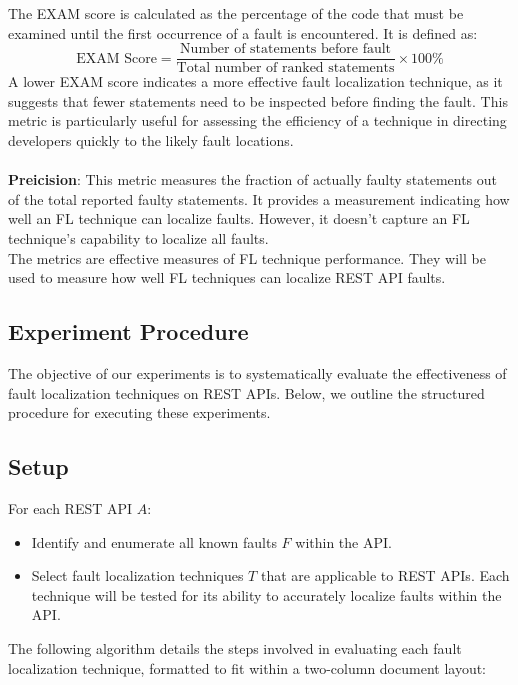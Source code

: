 \documentclass[conference]{IEEEtran}
\begin{document}
    The EXAM score is calculated as the percentage of the code that must be examined until the first occurrence of a fault is encountered. It is defined as:
    \\
    \[
        \text{EXAM Score} = \frac{\text{Number of statements before fault}}{\text{Total number of ranked statements}} \times 100\%
    \]
    A lower EXAM score indicates a more effective fault localization technique, as it suggests that fewer statements need to be inspected before finding the fault. This metric is particularly useful for assessing the efficiency of a technique in directing developers quickly to the likely fault locations.
    \\ \\
    \textbf{Preicision}: This metric measures the fraction of actually faulty statements out of the total reported faulty statements. It provides a measurement indicating how well an FL technique can localize faults. However, it doesn't capture an FL technique's capability to localize all faults.
    \\

The metrics are effective measures of FL technique performance. They will be used to measure how well FL techniques can localize REST API faults.

\subsection{Experiment Procedure}
\label{sec:experiment-procedure}



The objective of our experiments is to systematically evaluate the effectiveness of fault localization techniques on REST APIs. Below, we outline the structured procedure for executing these experiments.

\subsection{Setup}
For each REST API \( A \):
\begin{itemize}
    \item Identify and enumerate all known faults \( F \) within the API.
    \item Select fault localization techniques \( T \) that are applicable to REST APIs. Each technique will be tested for its ability to accurately localize faults within the API.
\end{itemize}

The following algorithm details the steps involved in evaluating each fault localization technique, formatted to fit within a two-column document layout:
\end{document}
